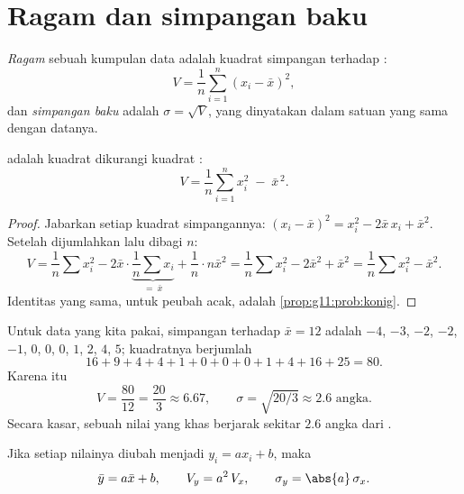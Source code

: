 \section{Ragam dan simpangan baku}

\begin{definition}\label{def:g11:stat:variance}
\emph{Ragam} sebuah kumpulan data adalah 
kuadrat simpangan terhadap :
\[
V = \frac{1}{n}\sum_{i=1}^{n} (x_i - \bar x)^2,
\]
dan \emph{simpangan baku} adalah
$\sigma = \sqrt{V}$, yang dinyatakan dalam satuan yang sama dengan datanya.
\end{definition}

\begin{proposition}\label{prop:g11:stat:shortcut}
 adalah  kuadrat dikurangi kuadrat :
\[
V = \frac{1}{n}\sum_{i=1}^{n} x_i^2 \;-\; \bar x^{\,2}.
\]
\end{proposition}

\begin{proof}
Jabarkan setiap kuadrat simpangannya:
$(x_i - \bar x)^2 = x_i^2 - 2\bar x\, x_i + \bar x^2$. Setelah dijumlahkan lalu
dibagi $n$:
\[
V = \frac1n \sum x_i^2 - 2\bar x \cdot \underbrace{\frac1n \sum
x_i}_{=\ \bar x} + \frac1n \cdot n\bar x^2
= \frac1n\sum x_i^2 - 2\bar x^2 + \bar x^2
= \frac1n\sum x_i^2 - \bar x^2 .
\]
Identitas yang sama, untuk peubah acak, adalah
\cref{prop:g11:prob:konig}.
\end{proof}

\begin{example}\label{ex:g11:stat:variance}
Untuk data yang kita pakai, simpangan terhadap $\bar x = 12$ adalah $-4$,
$-3$, $-2$, $-2$, $-1$, $0$, $0$, $0$, $1$, $2$, $4$, $5$; kuadratnya
berjumlah
\[
16 + 9 + 4 + 4 + 1 + 0 + 0 + 0 + 1 + 4 + 16 + 25 = 80 .
\]
Karena itu
\[
V = \frac{80}{12} = \frac{20}{3} \approx 6.67,
\qquad
\sigma = \sqrt{20/3} \approx 2.6 \text{ angka}.
\]
Secara kasar, sebuah nilai yang khas berjarak sekitar $2.6$ angka dari
.
\end{example}

\begin{proposition}\label{prop:g11:stat:affine}
Jika setiap nilainya diubah menjadi $y_i = a x_i + b$, maka
\[
\bar y = a \bar x + b,
\qquad
V_y = a^2\, V_x,
\qquad
\sigma_y = \abs{a}\,\sigma_x .
\]
\end{proposition}

